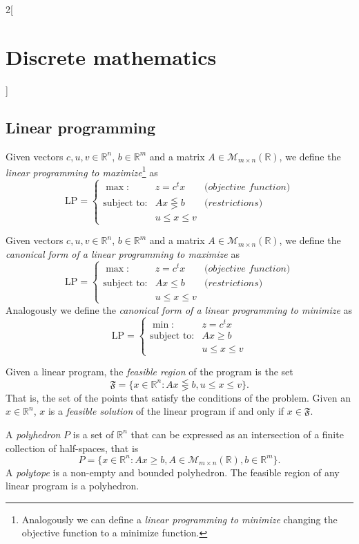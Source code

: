 \documentclass[../../../main.tex]{subfiles}
\begin{document}
\begin{multicols}{2}[\section{Discrete mathematics}]
\subsection{Linear programming}
\begin{definition}
Given vectors $c,u,v\in\mathbb{R}^n$, $b\in\mathbb{R}^m$ and a matrix $A\in\mathcal{M}_{m\times n}(\mathbb{R})$, we define the \textit{linear programming to maximize}\footnote{Analogously we can define a \textit{linear programming to minimize} changing the objective function to a minimize function.} as $$\text{LP}=\left\{\begin{array}{rcl}
    \max: & z=c^tx & \textit{(objective function)} \\
    \text{subject to}: & Ax\lesseqgtr b & \textit{(restrictions)}\\
     & u\leq x\leq v & 
    \end{array}\right.$$
\end{definition}
\begin{definition}
Given vectors $c,u,v\in\mathbb{R}^n$, $b\in\mathbb{R}^m$ and a matrix $A\in\mathcal{M}_{m\times n}(\mathbb{R})$, we define the \textit{canonical form of a linear programming to maximize} as $$\text{LP}=\left\{\begin{array}{rcl}
    \max: & z=c^tx & \textit{(objective function)} \\
    \text{subject to}: & Ax\leq b & \textit{(restrictions)}\\
     & u\leq x\leq v & 
    \end{array}\right.$$
Analogously we define the \textit{canonical form of a linear programming to minimize} as $$\text{LP}=\left\{\begin{array}{rc}
    \min: & z=c^tx \\
    \text{subject to}: & Ax\geq b\\
     & u\leq x\leq v
    \end{array}\right.$$
\end{definition}
\begin{definition}
Given a linear program, the \textit{feasible region} of the program is the set $$\mathfrak{F}=\{x\in\mathbb{R}^n:Ax\lesseqgtr b,u\leq x\leq v\}.$$ That is, the set of the points that satisfy the conditions of the problem. Given an $x\in\mathbb{R}^n$, $x$ is a \textit{feasible solution} of the linear program if and only if $x\in\mathfrak{F}$.
\end{definition}
\begin{definition}
A \textit{polyhedron} $P$ is a set of $\mathbb{R}^n$ that can be expressed as an intersection of a finite collection of half-spaces, that is $$P=\{x\in\mathbb{R}^n:Ax\geq b, A\in\mathcal{M}_{m\times n}(\mathbb{R}),b\in\mathbb{R}^m\}.$$ A \textit{polytope} is a non-empty and bounded polyhedron. The feasible region of any linear program is a polyhedron.

\end{definition}
\end{multicols}
\end{document}
